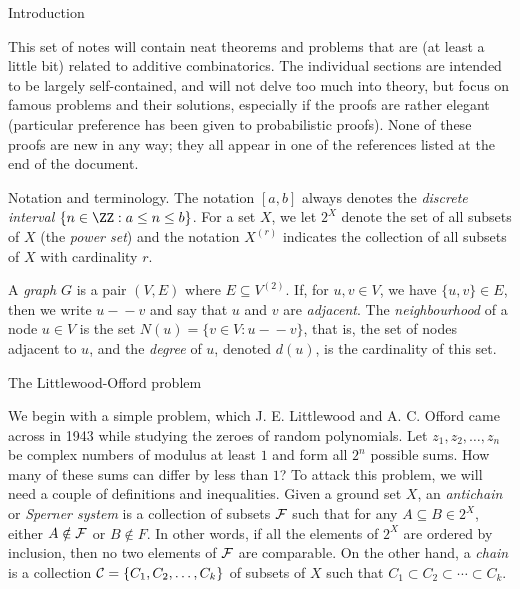 

\classicmode

\def\A{{\cal A}}
\def\C{{\cal C}}
\def\F{{\cal F}}

\def\edge{\mathrel-\!\!\!\mathrel-}


\advsect Introduction

This set of notes will contain neat theorems and problems that are (at least a little bit)
related to additive combinatorics. The individual sections are intended to be largely self-contained, and
will not delve too much into theory, but focus on famous problems and their solutions, especially if
the proofs are rather elegant (particular preference has been given to probabilistic proofs). None of these
proofs are new in any way; they all appear in one of the references listed at the end of the
document.

\medskip
\boldlabel Notation and terminology. The notation $[a,b]$ always denotes the {\it discrete interval}
$\{n\in \ZZ : a\leq n\leq b\}$. For a set $X$, we let $2^X$ denote the set of all subsets of $X$ (the {\it
power set}) and the notation $X^{(r)}$ indicates the collection of all subsets
of $X$ with cardinality $r$.

A {\it graph} $G$ is a pair $(V,E)$ where $E\subseteq V^{(2)}$. If, for $u,v\in
V$, we have $\{u,v\}\in E$, then we write $u \edge v$ and say that $u$ and $v$ are {\it adjacent}. The
{\it neighbourhood} of a node $u\in V$ is the set $N(u)=\{v\in V: u\edge v\}$, that is, the set of
nodes adjacent to $u$, and the {\it degree} of $u$, denoted $d(u)$, is the cardinality of this set.

\advsect The Littlewood-Offord problem

We begin with a simple problem, which J. E. Littlewood and A. C. Offord came across in 1943 while studying the
zeroes of random polynomials. Let $z_1, z_2, \ldots, z_n$ be complex numbers of modulus at least $1$ and form
all $2^n$ possible sums. How many of these sums can differ by less than $1$? To attack this problem, we will
need a couple of definitions and inequalities. Given a ground set $X$,
an {\it antichain} or {\it Sperner system} is a collection
of subsets $\F$ such that for any $A\subseteq B\in 2^X$, either $A\notin \F$ or $B\notin F$. In other words,
if all the elements of $2^X$ are ordered by inclusion, then no two elements of $\F$ are comparable. On the
other hand, a {\it chain} is a collection $\C = \{C_1, C_2, \ldots, C_k\}$ of subsets of $X$ such that
$C_1\subset C_2 \subset \cdots \subset C_k$.

